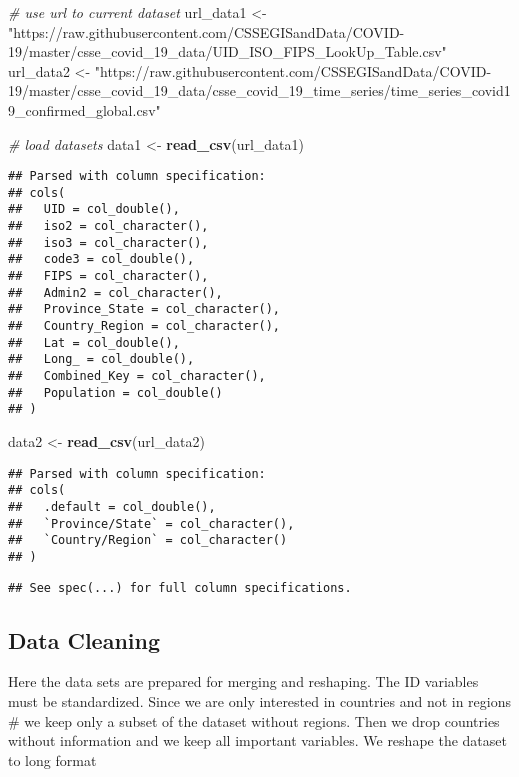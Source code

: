 \documentclass[]{article}
\newenvironment{Shaded}{\begin{snugshade}}{\end{snugshade}}
\newcommand{\CommentTok}[1]{\textcolor[rgb]{0.56,0.35,0.01}{\textit{#1}}}
\newcommand{\KeywordTok}[1]{\textcolor[rgb]{0.13,0.29,0.53}{\textbf{#1}}}
\newcommand{\NormalTok}[1]{#1}
\newcommand{\StringTok}[1]{\textcolor[rgb]{0.31,0.60,0.02}{#1}}
\begin{document}
\begin{Shaded}
\begin{Highlighting}[]
\CommentTok{# use url to current dataset}
\NormalTok{url_data1 <-}\StringTok{ "https://raw.githubusercontent.com/CSSEGISandData/COVID-19/master/csse_covid_19_data/UID_ISO_FIPS_LookUp_Table.csv"}
\NormalTok{url_data2 <-}\StringTok{ "https://raw.githubusercontent.com/CSSEGISandData/COVID-19/master/csse_covid_19_data/csse_covid_19_time_series/time_series_covid19_confirmed_global.csv"}

\CommentTok{# load datasets}
\NormalTok{data1 <-}\StringTok{ }\KeywordTok{read_csv}\NormalTok{(url_data1)}
\end{Highlighting}
\end{Shaded}

\begin{verbatim}
## Parsed with column specification:
## cols(
##   UID = col_double(),
##   iso2 = col_character(),
##   iso3 = col_character(),
##   code3 = col_double(),
##   FIPS = col_character(),
##   Admin2 = col_character(),
##   Province_State = col_character(),
##   Country_Region = col_character(),
##   Lat = col_double(),
##   Long_ = col_double(),
##   Combined_Key = col_character(),
##   Population = col_double()
## )
\end{verbatim}

\begin{Shaded}
\begin{Highlighting}[]
\NormalTok{data2 <-}\StringTok{ }\KeywordTok{read_csv}\NormalTok{(url_data2)}
\end{Highlighting}
\end{Shaded}

\begin{verbatim}
## Parsed with column specification:
## cols(
##   .default = col_double(),
##   `Province/State` = col_character(),
##   `Country/Region` = col_character()
## )
\end{verbatim}

\begin{verbatim}
## See spec(...) for full column specifications.
\end{verbatim}

\hypertarget{data-cleaning}{%
\subsection{Data Cleaning}\label{data-cleaning}}

Here the data sets are prepared for merging and reshaping. The ID
variables must be standardized. Since we are only interested in
countries and not in regions \# we keep only a subset of the dataset
without regions. Then we drop countries without information and we keep
all important variables. We reshape the dataset to long format
\end{document}
